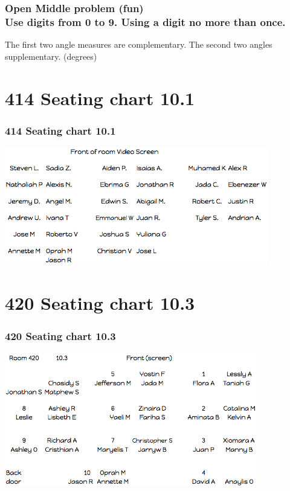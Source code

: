 \documentclass{beamer}
\begin{document}
  \frame
  {
    \frametitle{Open Middle problem (fun) \\
    Use digits from 0 to 9. Using a digit no more than once.}
      The first two angle measures are complementary. The second two angles supplementary. (degrees)\\[0.75cm]
         \vspace{5cm} 
  }

  \section{414 Seating chart 10.1}
  \frame
  {
    \frametitle{414 Seating chart 10.1}
    \includegraphics[width=11.5cm]{Seating_10A-414.png}
  }

  \section{420 Seating chart 10.3}
  \frame
  {
    \frametitle{420 Seating chart 10.3}
    \begin{center}
      \includegraphics[width=11cm]{10C_seating.png}
    \end{center}
  }
\end{document}
